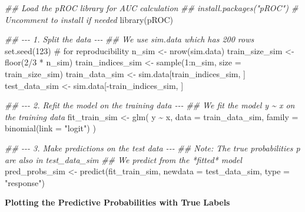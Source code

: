 \documentclass[
  letterpaper,
]{scrbook}
\newenvironment{Shaded}{\begin{snugshade}}{\end{snugshade}}
\newcommand{\AttributeTok}[1]{\textcolor[rgb]{0.40,0.45,0.13}{#1}}
\newcommand{\CommentTok}[1]{\textcolor[rgb]{0.37,0.37,0.37}{#1}}
\newcommand{\DecValTok}[1]{\textcolor[rgb]{0.68,0.00,0.00}{#1}}
\newcommand{\DocumentationTok}[1]{\textcolor[rgb]{0.37,0.37,0.37}{\textit{#1}}}
\newcommand{\FunctionTok}[1]{\textcolor[rgb]{0.28,0.35,0.67}{#1}}
\newcommand{\NormalTok}[1]{\textcolor[rgb]{0.00,0.23,0.31}{#1}}
\newcommand{\OtherTok}[1]{\textcolor[rgb]{0.00,0.23,0.31}{#1}}
\newcommand{\SpecialCharTok}[1]{\textcolor[rgb]{0.37,0.37,0.37}{#1}}
\newcommand{\StringTok}[1]{\textcolor[rgb]{0.13,0.47,0.30}{#1}}
\begin{document}
\begin{Shaded}
\begin{Highlighting}[]
\DocumentationTok{\#\# Load the pROC library for AUC calculation}
\DocumentationTok{\#\# install.packages("pROC") \# Uncomment to install if needed}
\FunctionTok{library}\NormalTok{(pROC)}

\DocumentationTok{\#\# {-}{-}{-} 1. Split the data {-}{-}{-}}
\DocumentationTok{\#\# We use \textquotesingle{}sim.data\textquotesingle{} which has 200 rows}
\FunctionTok{set.seed}\NormalTok{(}\DecValTok{123}\NormalTok{) }\CommentTok{\# for reproducibility}
\NormalTok{n\_sim }\OtherTok{\textless{}{-}} \FunctionTok{nrow}\NormalTok{(sim.data)}
\NormalTok{train\_size\_sim }\OtherTok{\textless{}{-}} \FunctionTok{floor}\NormalTok{(}\DecValTok{2}\SpecialCharTok{/}\DecValTok{3} \SpecialCharTok{*}\NormalTok{ n\_sim)}
\NormalTok{train\_indices\_sim }\OtherTok{\textless{}{-}} \FunctionTok{sample}\NormalTok{(}\DecValTok{1}\SpecialCharTok{:}\NormalTok{n\_sim, }\AttributeTok{size =}\NormalTok{ train\_size\_sim)}
\NormalTok{train\_data\_sim }\OtherTok{\textless{}{-}}\NormalTok{ sim.data[train\_indices\_sim, ]}
\NormalTok{test\_data\_sim  }\OtherTok{\textless{}{-}}\NormalTok{ sim.data[}\SpecialCharTok{{-}}\NormalTok{train\_indices\_sim, ]}

\DocumentationTok{\#\# {-}{-}{-} 2. Refit the model on the training data {-}{-}{-}}
\DocumentationTok{\#\# We fit the model y \textasciitilde{} x on the training data}
\NormalTok{fit\_train\_sim }\OtherTok{\textless{}{-}} \FunctionTok{glm}\NormalTok{(}
\NormalTok{  y }\SpecialCharTok{\textasciitilde{}}\NormalTok{ x,}
  \AttributeTok{data =}\NormalTok{ train\_data\_sim,}
  \AttributeTok{family =} \FunctionTok{binomial}\NormalTok{(}\AttributeTok{link =} \StringTok{"logit"}\NormalTok{)}
\NormalTok{)}

\DocumentationTok{\#\# {-}{-}{-} 3. Make predictions on the test data {-}{-}{-}}
\DocumentationTok{\#\# Note: The true probabilities \textquotesingle{}p\textquotesingle{} are also in test\_data\_sim}
\DocumentationTok{\#\# We predict from the *fitted* model}
\NormalTok{pred\_probs\_sim }\OtherTok{\textless{}{-}} \FunctionTok{predict}\NormalTok{(fit\_train\_sim, }\AttributeTok{newdata =}\NormalTok{ test\_data\_sim, }\AttributeTok{type =} \StringTok{"response"}\NormalTok{)}
\end{Highlighting}
\end{Shaded}

\textbf{Plotting the Predictive Probabilities with True Labels}
\end{document}
